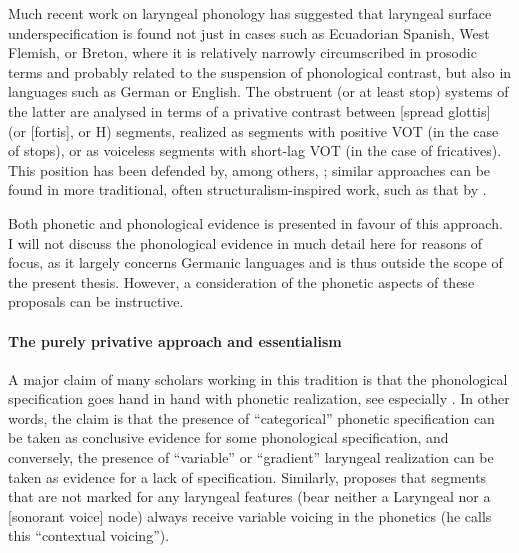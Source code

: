 Much recent work on laryngeal phonology has suggested that laryngeal surface underspecification is found not just in cases such as Ecuadorian Spanish, West Flemish, or Breton, where it is relatively narrowly circumscribed in prosodic terms and probably related to the suspension of phonological contrast, but also in languages such as German or English. The obstruent (or at least stop) systems of the latter are analysed in terms of a privative contrast between [spread glottis] (or [fortis], or H) segments, realized as segments with positive VOT (in the case of stops), or as voiceless segments with short-lag VOT (in the case of fricatives). This position has been defended by, among others, \citet{iverson95,iverson99:_laryn_german,iverson03:_laryn_german,iverson07:_domain_and_direc_in_evolut,ringen99:_aspir_preas_deasp_sonor_devoic_spiran_icelan,jessen02:_laryn_german,honeybone01:_lenit_liver_englis,honeybone05,honeyboneng:_lenit_englis,petrova06:_voice}; similar approaches can be found in more traditional, often structuralism\hyp inspired work, such as that by \citet{steblin-kamenskij60:_den,steblin-kamenskij63:_some_german,steblin,goblirsch05:_lautv_sprac}.

Both phonetic and phonological evidence is presented in favour of this approach. I will not discuss the phonological evidence in much detail here for reasons of focus, as it largely concerns Germanic languages and is thus outside the scope of the present thesis. However, a consideration of the phonetic aspects of these proposals can be instructive.

\paragraph{The purely privative approach and essentialism}
\label{sec:purely-priv-appr}

A major claim of many scholars working in this tradition is that the phonological specification goes hand in hand with phonetic realization, see especially \citet{HelgasonRingen2004,helgason08:_voicin_swedis,petrova06:_voice,beckman11:_rate_swedis_vot}. In other words, the claim is that the presence of \enquote{categorical} phonetic specification can be taken as conclusive evidence for some phonological specification, and conversely, the presence of \enquote{variable} or \enquote{gradient} laryngeal realization can be taken as evidence for a lack of specification. Similarly, \citet{avery96:_repres_of_voicin_contr} proposes that segments that are not marked for any laryngeal features (\ie bear neither a Laryngeal nor a [sonorant voice] node) always receive variable voicing in the phonetics (he calls this \enquote{contextual voicing}).

